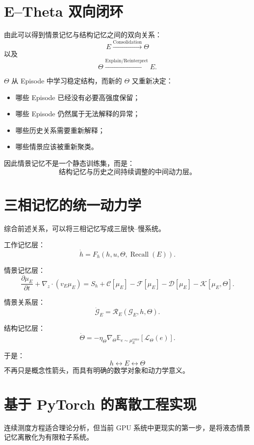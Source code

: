 \section{E--Theta 双向闭环}

由此可以得到情景记忆与结构记忆之间的双向关系：
\[
\boxed{
E
\xrightarrow{\mathrm{Consolidation}}
\Theta
}
\]
以及
\[
\boxed{
\Theta
\xrightarrow{\mathrm{Explain/Reinterpret}}
E.
}
\]

$\Theta$ 从 Episode 中学习稳定结构，而新的 $\Theta$ 又重新决定：

\begin{itemize}
    \item 哪些 Episode 已经没有必要高强度保留；
    \item 哪些 Episode 仍然属于无法解释的异常；
    \item 哪些历史关系需要重新解释；
    \item 哪些情景应该被重新聚类。
\end{itemize}

因此情景记忆不是一个静态训练集，而是：
\[
\boxed{
\text{结构记忆与历史之间持续调整的中间动力层。}
}
\]

\section{三相记忆的统一动力学}

综合前述关系，可以将三相记忆写成三层快--慢系统。

工作记忆层：
\[
\boxed{
\dot h
=
F_h
\left(
h,
u,
\Theta,
\operatorname{Recall}(E)
\right).
}
\]

情景记忆层：
\[
\boxed{
\frac{\partial \mu_E}{\partial t}
+
\nabla_z\cdot(v_E\mu_E)
=
S_h
+
\mathcal C[\mu_E]
-
\mathcal F[\mu_E]
-
\mathcal D[\mu_E]
-
\mathcal K[\mu_E,\Theta].
}
\]

情景关系层：
\[
\boxed{
\dot{\mathcal G}_E
=
\mathcal R_E
\left(
\mathcal G_E,
h,
\Theta
\right).
}
\]

结构记忆层：
\[
\boxed{
\dot\Theta
=
-\eta_\Theta
\nabla_\Theta
\mathbb E_{
e\sim\mu_E^{cons}
}
\left[
\mathcal L_\Theta(e)
\right].
}
\]

于是：
\[
\boxed{
h
\leftrightarrow
E
\leftrightarrow
\Theta
}
\]
不再只是概念性箭头，而具有明确的数学对象和动力学意义。

\section{基于 PyTorch 的离散工程实现}

连续测度方程适合理论分析，但当前 GPU 系统中更现实的第一步，是将液态情景记忆离散化为有限粒子系统。

